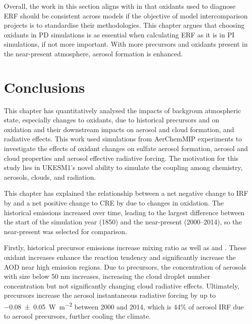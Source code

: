 % 
Overall, the work in this section aligns with \citet{karsetStrongImpactsAerosol2018} in that oxidants used to diagnose ERF should be consistent across models if the objective of model intercomparison projects is to standardise their methodologies. This chapter argues that choosing oxidants in PD simulations is as essential when calculating ERF as it is in PI simulations, if not more important. With more precursors and oxidants present in the near-present atmosphere, aerosol formation is enhanced. 


\section{Conclusions}

This chapter has quantitatively analysed the impacts of backgroun atmospheric state, especially changes to oxidants, due to historical  precursors and  on  oxidation and their downstream impacts on aerosol and cloud formation, and radiative effects. This work used simulations from AerChemMIP experiments to investigate the effects of oxidant changes on sulfate aerosol formation, aerosol and cloud properties and aerosol effective radiative forcing. The motivation for this study lies in UKESM1's novel ability to simulate the coupling among chemistry, aerosols, clouds, and radiation.

This chapter has explained the relationship between a net negative change to IRF by  and a net positive change to CRE by  due to changes in oxidation. The historical emissions increased over time, leading to the largest difference between the start of the simulation year (1850) and the near-present (2000--2014), so the near-present was selected for comparison.

Firstly, historical  precursor emissions increase  mixing ratio as well as  and . These oxidant increases enhance the  reaction tendency and significantly increase the AOD near high  emission regions. Due to  precursors, the concentration of aerosols with size below 50 nm increases, increasing the cloud droplet number concentration but not significantly changing cloud radiative effects. Ultimately,  precursors increase the aerosol instantaneous radiative forcing by up to \qty{-0.08+-0.05}{\watt\per\metre\squared} between 2000 and 2014, which is 44\% of aerosol IRF due to aerosol precursors, further cooling the climate.

